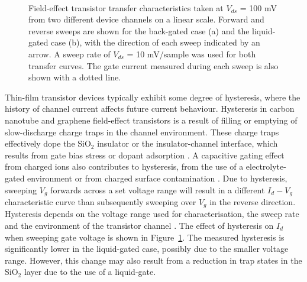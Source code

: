 \documentclass[
  a4paper,
]{scrbook}
\begin{document}
\begin{figure}
\begin{minipage}[t]{0.45\linewidth}
{{}

}

\end{minipage}%
%
\begin{minipage}[t]{0.01\linewidth}

{\centering 

~

}

\end{minipage}%

\caption[Field-effect transistor transfer characteristics of back-gated
and liquid-gated device channels showing
hysteresis.]{\label{fig-gating-hysteresis}Field-effect transistor
transfer characteristics taken at \(V_{ds}\) = 100 mV from two different
device channels on a linear scale. Forward and reverse sweeps are shown
for the back-gated case (a) and the liquid-gated case (b), with the
direction of each sweep indicated by an arrow. A sweep rate of
\(V_{ds}\) = 10 mV/sample was used for both transfer curves. The gate
current measured during each sweep is also shown with a dotted line.}

\end{figure}

Thin-film transistor devices typically exhibit some degree of
hysteresis, where the history of channel current affects future current
behaviour. Hysteresis in carbon nanotube and graphene field-effect
transistors is a result of filling or emptying of slow-discharge charge
traps in the channel environment. These charge traps effectively dope
the SiO\(_2\) insulator or the insulator-channel interface, which
results from gate bias stress or dopant adsorption
\autocite{McEuen2002,Kim2003,Wang2010,Bartolomeo2011,Bargaoui2018,Peng2018}.
A capacitive gating effect from charged ions also contributes to
hysteresis, from the use of a electrolyte-gated environment or from
charged surface contamination \autocite{Wang2010,Yao2021}. Due to
hysteresis, sweeping \(V_g\) forwards across a set voltage range will
result in a different \(I_d - V_g\) characteristic curve than
subsequently sweeping over \(V_g\) in the reverse direction. Hysteresis
depends on the voltage range used for characterisation, the sweep rate
and the environment of the transistor channel
\autocite{Kim2003,Wang2010}. The effect of hysteresis on \(I_d\) when
sweeping gate voltage is shown in Figure~\ref{fig-gating-hysteresis}.
The measured hysteresis is significantly lower in the liquid-gated case,
possibly due to the smaller voltage range. However, this change may also
result from a reduction in trap states in the SiO\(_2\) layer due to the
use of a liquid-gate.
\end{document}
